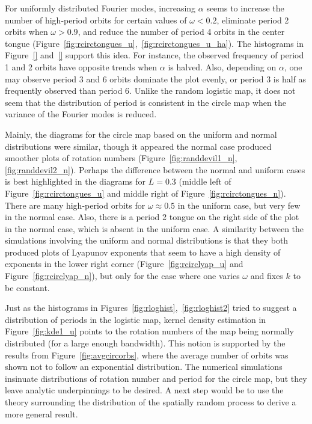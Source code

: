 For uniformly distributed Fourier modes, increasing $\alpha$ seems to increase the number of
high-period orbits for certain values of $\omega < 0.2$, eliminate period
2 orbits when $\omega >0.9$, and reduce the number of period 4 orbits
in the center tongue
(Figure~\ref{fig:rcirctongues_u},~\ref{fig:rcirctongues_u_ha}). The
histograms in Figure~\ref{} and~\ref{} support this idea. For
instance, the observed frequency of
period 1 and 2 orbits have opposite trends when $\alpha$ is
halved. Also, depending on $\alpha$, one may observe period 3 and 6 orbits dominate the plot evenly, or period 3 is half as frequently observed than
period 6. Unlike the random logistic map, it does not seem that the
distribution of period is consistent in the circle map when the
variance of the Fourier modes is reduced.  

Mainly, the diagrams for the circle map based on the uniform and
normal distributions were similar, though it appeared the normal
case produced smoother plots of rotation numbers
(Figure~\ref{fig:randdevil1_n}, \ref{fig:randdevil2_n}). Perhaps the
difference between the normal and uniform cases is best highlighted in
the diagrams for $L = 0.3$ (middle left of
Figure~\ref{fig:rcirctongues_u} and middle right of
Figure~\ref{fig:rcirctongues_n}). There are many high-period orbits
for $\omega\approx 0.5$ in the uniform case, but very
few in the normal case. Also, there is a period 2 tongue on the right
side of the plot in the normal case, which is absent in the uniform
case. A similarity between the simulations involving the uniform and normal
distributions is that they both produced plots of Lyapunov exponents that seem to have a
high density of exponents in the lower right corner
(Figure~\ref{fig:rcirclyap_u} and Figure~\ref{fig:rcirclyap_n}), but
only for the case where one varies $\omega$ and fixes $k$ to be
constant.

Just as the histograms in Figures~\ref{fig:rloghist},~\ref{fig:rloghist2} tried to suggest a
distribution of periods in the logistic map, kernel density estimation
in Figure~\ref{fig:kde1_u} points to the rotation numbers of the map
being normally distributed (for a large enough bandwidth). This notion
is supported by the results from Figure~\ref{fig:avgcircorbs}, where
the average number of orbits was shown not to follow an exponential
distribution. The numerical simulations insinuate distributions of
rotation number and period for the circle map, but they leave analytic
underpinnings to be desired. A next step would be to use the theory
surrounding the distribution of the spatially random process to derive
a more general result.

